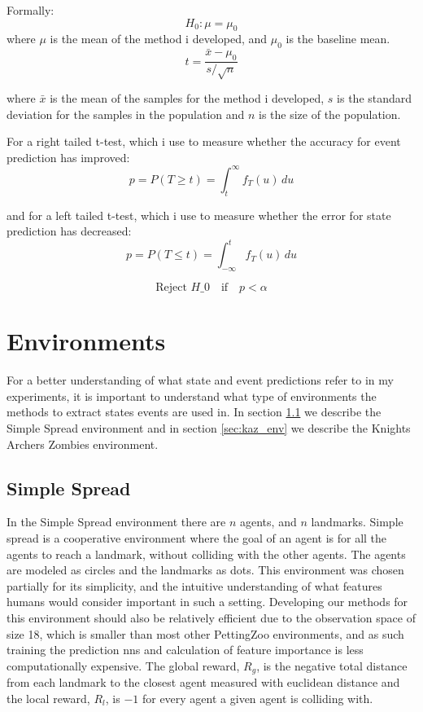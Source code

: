 \documentclass[UKenglish]{uiomasterthesis}
\begin{document}
Formally: 
$$
H_0: \mu = \mu_0
$$
where $\mu$ is the mean of the method i developed, and $\mu_0$ is the baseline mean.
$$
t = \frac{\bar{x} - \mu_0}{s/\sqrt{n}}
$$

where $\bar{x}$ is the mean of the samples for the method i developed, $s$ is the standard deviation for the samples in the population and $n$ is the size of the population.

For a right tailed t-test, which i use to measure whether the accuracy for event prediction has improved:
$$p = P(T \geq t) = \int_{t}^{\infty} f_T(u)\,du$$

and for a left tailed t-test, which i use to measure whether the error for state prediction has decreased:
$$p = P(T \leq t) = \int_{-\infty}^{t} f_T(u)\,du$$

$$\text{Reject } H\_0 \quad \text{if} \quad p < \alpha$$

\section{Environments}
\label{sec:env_meth}
For a better understanding of what state and event predictions refer to in my experiments, it is important to understand what type of environments the methods to extract states events are used in. In section \ref{sec:simpl_env} we describe the Simple Spread environment and in section \ref{sec:kaz_env} we describe the Knights Archers Zombies environment.

\subsection{Simple Spread}
\label{sec:simpl_env}
In the Simple Spread environment there are $n$ agents, and $n$ landmarks. Simple spread is a cooperative environment where the goal of an agent is for all the agents to reach a landmark, without colliding with the other agents. The agents are modeled as circles and the landmarks as dots. This environment was chosen partially for its simplicity, and the intuitive understanding of what features humans would consider important in such a setting. Developing our methods for this environment should also be relatively efficient due to the observation space of size 18, which is smaller than most other PettingZoo environments, and as such training the prediction \acp{nn} and calculation of feature importance is less computationally expensive. The global reward, $R_g$, is the negative total distance from each landmark to the closest agent measured with euclidean distance and the local reward, $R_l$, is $-1$ for every agent a given agent is colliding with.
\end{document}
